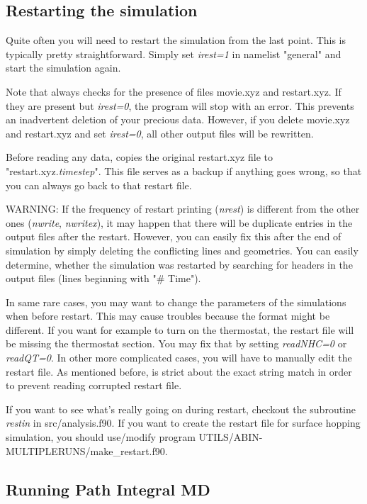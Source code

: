 \documentclass[12pt,a4paper]{article}
\begin{document}
\subsection{Restarting the simulation}

Quite often you will need to restart the simulation from the last point. This is typically pretty straightforward. Simply set \textit{irest=1} in namelist "general" and start the simulation again. 

Note that \abin always checks for the presence of files movie.xyz and restart.xyz. If they are present but \textit{irest=0}, the program will stop with an error. This prevents an inadvertent deletion of your precious data. However, if you delete movie.xyz and restart.xyz and set \textit{irest=0}, all other output files will be rewritten. 

Before reading any data, \abin copies the original restart.xyz file to "restart.xyz.\textit{timestep}". This file serves as a backup if anything goes wrong, so that you can always go back to that restart file. 

WARNING: If the frequency of restart printing (\textit{nrest}) is different from the other ones (\textit{nwrite}, \textit{nwritex}), it may happen that there will be duplicate entries in the output files after the restart. However, you can easily fix this after the end of simulation by simply deleting the conflicting lines and geometries. You can easily determine, whether the simulation was restarted by searching for headers in the output files (lines beginning with "\# Time").

In same rare cases, you may want to change the parameters of the simulations when before restart.
This may cause troubles because the format might be different. If you want for example to turn on the thermostat, the restart file will be missing the thermostat section. You may fix that by setting \textit{readNHC=0} or \textit{readQT=0}. In other more complicated cases, you will have to manually edit the restart file. As mentioned before, \abin is strict about the exact string match in order to prevent reading corrupted restart file.  

If you want to see what's really going on during restart, checkout the subroutine \textit{restin} in src/analysis.f90. If you want to create the restart file for surface hopping simulation, you should use/modify program UTILS/ABIN-MULTIPLERUNS/make\_restart.f90.

\subsection{Running Path Integral MD}
\end{document}
